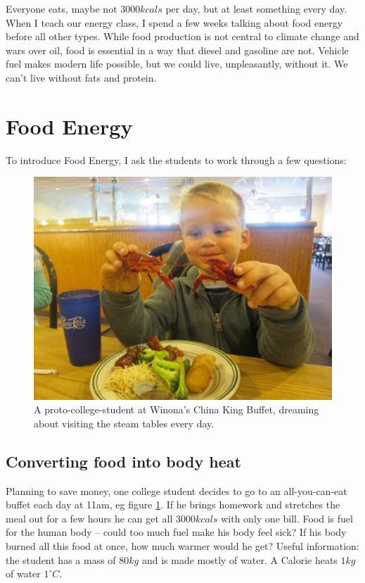 \documentclass[prb,preprint]{revtex4-2}
\begin{document}
Everyone eats, maybe not $3000 kcals$ per day, but at least something every day.  When I teach our energy class,\cite{Energy_textbook,PFFP} 
I spend a few weeks talking about food energy before all other types.  While food production is not central to climate change and wars over oil, food is essential in a way that diesel and gasoline are not.  Vehicle fuel makes modern life possible, but we could live, unpleasantly, without it.  We can't live without fats and protein.  

\section{Food Energy}

To introduce Food Energy, I ask the students to work through a few questions:

\begin{figure}[h]
\centering
\includegraphics[width=\columnwidth]{at_the_buffet.jpg}
\caption{
A proto-college-student at 
Winona's 
China King Buffet, dreaming about visiting the steam tables every day. 
}
\label{buffet}
\end{figure}

\subsection{Converting food into body heat}
Planning to save money, one college student decides to go to an all-you-can-eat buffet each day at 11am, eg figure \ref{buffet}.  If he brings homework and stretches the meal out for a few hours he can get all $3000kcals$ with only one bill.  Food is fuel for the human body -- could too much fuel make his body feel sick? If his body burned all this food at once, how much warmer would he get? 
Useful information: the student has a mass of $80kg$ and is made mostly of water.  A Calorie heats $1 kg$ of water $1^{\circ}C$. 
\end{document}
